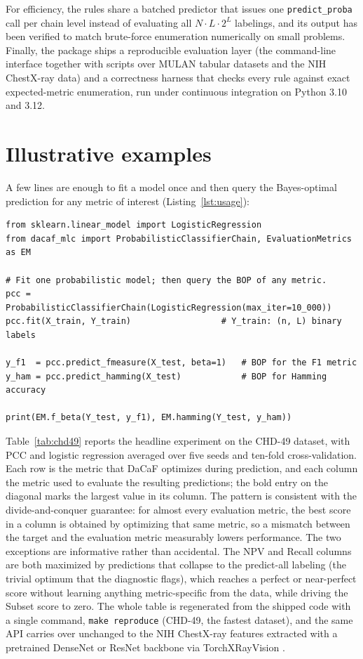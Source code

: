 \documentclass[11pt, letterpaper]{article}
\begin{document}
For efficiency, the rules share a batched predictor that issues one \texttt{predict\_proba} call
per chain level instead of evaluating all $N\cdot L\cdot 2^L$ labelings, and its output has been
verified to match brute-force enumeration numerically on small problems. Finally, the package
ships a reproducible evaluation layer (the command-line interface together with scripts over
MULAN tabular datasets and the NIH ChestX-ray data) and a correctness harness that checks every
rule against exact expected-metric enumeration, run under continuous integration on Python 3.10
and 3.12.

\section{Illustrative examples}\label{sec:examples}
A few lines are enough to fit a model once and then query the Bayes-optimal prediction
for any metric of interest (Listing~\ref{lst:usage}):
\begin{lstlisting}[style=pythonstyle,caption={Fit one probabilistic model, then read off the Bayes-optimal prediction (BOP) for any metric.},label={lst:usage}]
from sklearn.linear_model import LogisticRegression
from dacaf_mlc import ProbabilisticClassifierChain, EvaluationMetrics as EM

# Fit one probabilistic model; then query the BOP of any metric.
pcc = ProbabilisticClassifierChain(LogisticRegression(max_iter=10_000))
pcc.fit(X_train, Y_train)                  # Y_train: (n, L) binary labels

y_f1  = pcc.predict_fmeasure(X_test, beta=1)   # BOP for the F1 metric
y_ham = pcc.predict_hamming(X_test)            # BOP for Hamming accuracy

print(EM.f_beta(Y_test, y_f1), EM.hamming(Y_test, y_ham))
\end{lstlisting}
Table~\ref{tab:chd49} reports the headline experiment on the CHD-49 dataset, with PCC and
logistic regression averaged over five seeds and ten-fold cross-validation. Each row is the
metric that DaCaF optimizes during prediction, and each column the metric used to evaluate
the resulting predictions; the bold entry on the diagonal marks the largest value in its
column. The pattern is consistent with the divide-and-conquer guarantee: for almost every
evaluation metric, the best score in a column is obtained by optimizing that same metric, so
a mismatch between the target and the evaluation metric measurably lowers performance. The
two exceptions are informative rather than accidental. The NPV and Recall columns are both
maximized by predictions that collapse to the predict-all labeling (the trivial optimum that
the diagnostic flags), which reaches a perfect or near-perfect score without learning anything
metric-specific from the data, while driving the Subset score to zero. The whole table is
regenerated from the shipped code with a single command, \texttt{make reproduce} (CHD-49, the
fastest dataset), and the same API carries over unchanged to the NIH ChestX-ray features
extracted with a pretrained DenseNet or ResNet backbone via TorchXRayVision \citep{txrv2022}.
\end{document}
